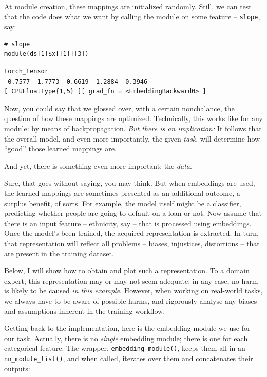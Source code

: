 \documentclass[
  letterpaper,
]{krantz}
\begin{document}
At module creation, these mappings are initialized randomly. Still, we
can test that the code does what we want by calling the module on some
feature -- \texttt{slope}, say:

\begin{verbatim}
# slope
module(ds[1]$x[[1]][3])
\end{verbatim}

\begin{verbatim}
torch_tensor
-0.7577 -1.7773 -0.6619  1.2884  0.3946
[ CPUFloatType{1,5} ][ grad_fn = <EmbeddingBackward0> ]
\end{verbatim}

Now, you could say that we glossed over, with a certain nonchalance, the
question of how these mappings are optimized. Technically, this works
like for any module: by means of backpropagation. \emph{But there is an
implication:} It follows that the overall model, and even more
importantly, the given \emph{task}, will determine how ``good'' those
learned mappings are.

And yet, there is something even more important: the \emph{data}.

Sure, that goes without saying, you may think. But when embeddings are
used, the learned mappings are sometimes presented as an additional
outcome, a surplus benefit, of sorts. For example, the model itself
might be a classifier, predicting whether people are going to default on
a loan or not. Now assume that there is an input feature -- ethnicity,
say -- that is processed using embeddings. Once the model's been
trained, the acquired representation is extracted. In turn, that
representation will reflect all problems -- biases, injustices,
distortions -- that are present in the training dataset.

Below, I will show how to obtain and plot such a representation. To a
domain expert, this representation may or may not seem adequate; in any
case, no harm is likely to be caused \emph{in this example}. However,
when working on real-world tasks, we always have to be aware of possible
harms, and rigorously analyse any biases and assumptions inherent in the
training workflow.

Getting back to the implementation, here is the embedding module we use
for our task. Actually, there is no \emph{single} embedding module;
there is one for each categorical feature. The wrapper,
\texttt{embedding\_module()}, keeps them all in an
\texttt{nn\_module\_list()}, and when called, iterates over them and
concatenates their outputs:
\end{document}
